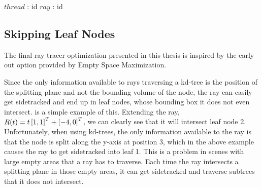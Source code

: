 \begin{algorithm}
  \caption{Converting a thread id to a ray id.}
  \label{alg:packet}
  \begin{algorithmic}
              {$thread$ : id}
              {$ray$ : id}
              {
              }
  \end{algorithmic}
\end{algorithm}


\subsection{Skipping Leaf Nodes}


The final ray tracer optimization presented in this thesis is inspired by the
early out option provided by Empty Space Maximization.


Since the only information available to rays traversing a kd-tree is the
position of the splitting plane and not the bounding volume of the node, the ray
can easily get sidetracked and end up in leaf nodes, whose bounding box it does
not even intersect.  is a simple example of
this. Extending the ray, $R(t) = t \left[1, 1 \right]^T + \left[-4, 0 \right]^T$, we can
clearly see that it will intersect leaf node 2. Unfortunately, when using
kd-trees, the only information available to the ray is that the node is split
along the y-axis at position 3, which in the above example causes the ray to get
sidetracked into leaf 1. This is a problem in scenes with large empty areas that
a ray has to traverse. Each time the ray intersects a splitting plane in those
empty areas, it can get sidetracked and traverse subtrees that it does not
intersect.


